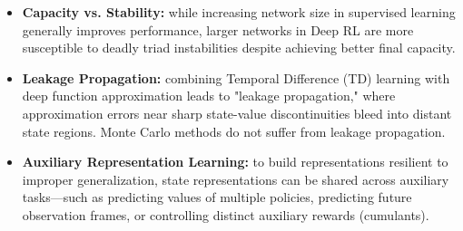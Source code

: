 \begin{itemize}
    \item \textbf{Capacity vs. Stability:} while increasing network size in supervised learning generally improves performance, larger networks in Deep RL are more susceptible to deadly triad instabilities despite achieving better final capacity.
    \item \textbf{Leakage Propagation:} combining Temporal Difference (TD) learning with deep function approximation leads to "leakage propagation," where approximation errors near sharp state-value discontinuities bleed into distant state regions. Monte Carlo methods do not suffer from leakage propagation.
    \item \textbf{Auxiliary Representation Learning:} to build representations resilient to improper generalization, state representations can be shared across auxiliary tasks—such as predicting values of multiple policies, predicting future observation frames, or controlling distinct auxiliary rewards (cumulants).
\end{itemize}

